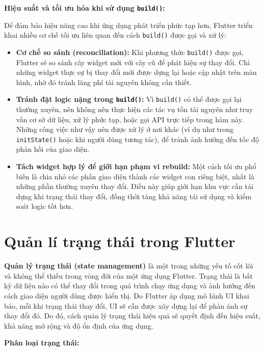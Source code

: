 \documentclass[../DoAn.tex]{subfiles}
\numberwithin{figure}{chapter}
\begin{document}
\textbf{Hiệu suất và tối ưu hóa khi sử dụng \texttt{build()}:}

Để đảm bảo hiệu năng cao khi ứng dụng phát triển phức tạp hơn, Flutter triển khai nhiều cơ chế tối ưu liên quan đến cách \texttt{build()} được gọi và xử lý:
\begin{itemize}
\item \textbf{Cơ chế so sánh (reconciliation):} Khi phương thức \texttt{build()} được gọi, Flutter sẽ so sánh cây widget mới với cây cũ để phát hiện sự thay đổi. Chỉ những widget thực sự bị thay đổi mới được dựng lại hoặc cập nhật trên màn hình, nhờ đó tránh lãng phí tài nguyên không cần thiết. 
\item \textbf{Tránh đặt logic nặng trong \texttt{build()}:} Vì \texttt{build()} có thể được gọi lại thường xuyên, nên không nên thực hiện các tác vụ tốn tài nguyên như truy vấn cơ sở dữ liệu, xử lý phức tạp, hoặc gọi API trực tiếp trong hàm này. Những công việc như vậy nên được xử lý ở nơi khác (ví dụ như trong \texttt{initState()} hoặc khi người dùng tương tác), để tránh ảnh hưởng đến tốc độ phản hồi của giao diện.
\item \textbf{Tách widget hợp lý để giới hạn phạm vi rebuild:} Một cách tối ưu phổ biến là chia nhỏ các phần giao diện thành các widget con riêng biệt, nhất là những phần thường xuyên thay đổi. Điều này giúp giới hạn khu vực cần tái dựng khi trạng thái thay đổi, đồng thời tăng khả năng tái sử dụng và kiểm soát logic tốt hơn.
\end{itemize}

\section{Quản lí trạng thái trong Flutter}
\textbf{Quản lý trạng thái (state management)} là một trong những yếu tố cốt lõi và không thể thiếu trong vòng đời của một ứng dụng Flutter. Trạng thái là bất kỳ dữ liệu nào có thể thay đổi trong quá trình chạy ứng dụng và ảnh hưởng đến cách giao diện người dùng được hiển thị. Do Flutter áp dụng mô hình UI khai báo, mỗi khi trạng thái thay đổi, UI sẽ cần được xây dựng lại để phản ánh sự thay đổi đó. Do đó, cách quản lý trạng thái hiệu quả sẽ quyết định đến hiệu suất, khả năng mở rộng và độ ổn định của ứng dụng.

\textbf{Phân loại trạng thái:}
\end{document}
